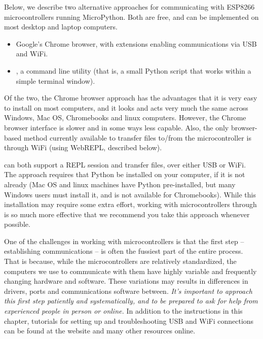 Below, we describe two alternative approaches for communicating with  ESP8266 microcontrollers running MicroPython. Both are free, and can be implemented on most desktop and laptop computers. 
\begin{itemize}
	\item Google's Chrome browser, with extensions enabling communications via USB and WiFi. 
	\item \mpfshell, a command line utility (that is, a small Python script that works within a simple terminal window).
\end{itemize}
Of the two, the Chrome browser approach has the advantages that it is very easy to install on most computers, and it looks and acts very much the same across Windows, Mac OS, Chromebooks and linux computers. 
However, the Chrome browser interface is slower and in some ways less capable. 
Also, the only browser-based method currently available to transfer files to/from the microcontroller is through WiFi (using WebREPL, described below). 

\mpfshell can both support a REPL session and transfer files, over either USB or WiFi. 
The \mpfshell approach requires that Python be installed on your computer, if it is not already 
(Mac OS and linux machines have Python pre-installed, but many Windows users must install it, and \mpfshell is not available for Chromebooks). 
While this installation may require some extra effort, working with microcontrollers through \mpfshell is so much more effective that we recommend you take this approach whenever possible.


\begin{kaobox}[frametitle=As you get started \dots]
One of the challenges in working with microcontrollers is that the first step -- establishing communications -- is often the fussiest part of the entire process. 
That is because, while the microcontrollers are relatively standardized, the computers we use to communicate with them have highly variable and frequently changing hardware and software. 
These variations may results in differences in drivers, ports and communications software between. 
\emph{It's important to approach this first step patiently and systematically, and to be prepared to ask for help from experienced people in person or online.}
In addition to the instructions in this chapter, tutorials for setting up and troubleshooting USB and WiFi connections can be found at the  website and many other resources online.
\end{kaobox}


